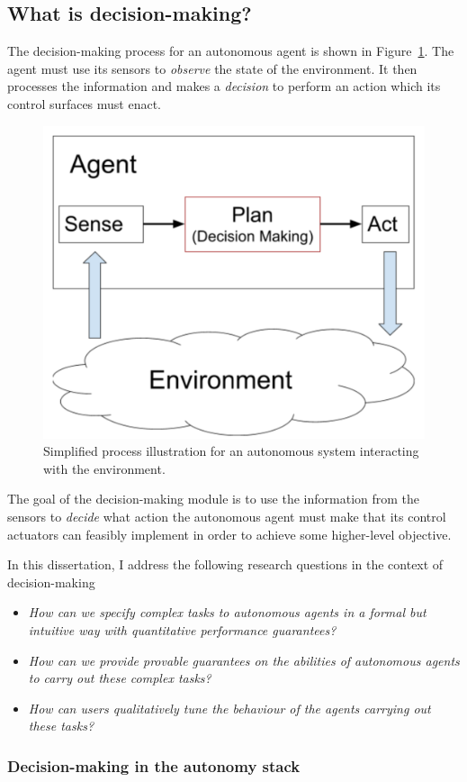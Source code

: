 \subsection{What is decision-making?}

The decision-making process for an autonomous agent is shown in Figure~\ref{fig:decisionloop}. The agent must use its sensors to \emph{observe} the state of the environment. It then processes the information and makes a \emph{decision} to perform an action which its control surfaces must enact.
\begin{figure}
	\centering
	\includegraphics[width=0.5\linewidth]{Introduction/Figs/decisionloop}
	\caption{Simplified process illustration for an autonomous system interacting with the environment.}\label{fig:decisionloop}
\end{figure}


The goal of the decision-making module is to use the information from the sensors to \emph{decide} what action the autonomous agent must make that its control actuators can feasibly implement in order to achieve some higher-level objective. 

In this dissertation, I address the following research questions in the context of decision-making

\begin{itemize}
	\item \emph{How can we specify complex tasks to autonomous agents in a formal but intuitive way with quantitative performance guarantees?}
	\item \emph{How can we provide provable guarantees on the abilities of autonomous agents to carry out these complex tasks?}
	\item \emph{How can users qualitatively tune the behaviour of the agents carrying out these tasks?}
\end{itemize}


\subsubsection{Decision-making in the autonomy stack}


